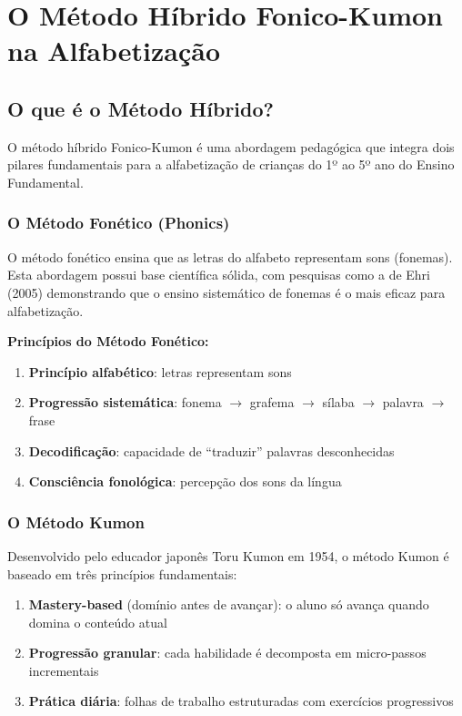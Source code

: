 
\chapter{O Método Híbrido Fonico-Kumon na Alfabetização}

\section{O que é o Método Híbrido?}

O método híbrido Fonico-Kumon é uma abordagem pedagógica que integra dois pilares fundamentais para a alfabetização de crianças do 1º ao 5º ano do Ensino Fundamental.

\subsection{O Método Fonético (Phonics)}

O método fonético ensina que as letras do alfabeto representam sons (fonemas). Esta abordagem possui base científica sólida, com pesquisas como a de Ehri (2005) demonstrando que o ensino sistemático de fonemas é o mais eficaz para alfabetização.

\textbf{Princípios do Método Fonético:}
\begin{enumerate}[leftmargin=2cm]
  \item \textbf{Princípio alfabético}: letras representam sons
  \item \textbf{Progressão sistemática}: fonema $\rightarrow$ grafema $\rightarrow$ sílaba $\rightarrow$ palavra $\rightarrow$ frase
  \item \textbf{Decodificação}: capacidade de ``traduzir'' palavras desconhecidas
  \item \textbf{Consciência fonológica}: percepção dos sons da língua
\end{enumerate}

\subsection{O Método Kumon}

Desenvolvido pelo educador japonês Toru Kumon em 1954, o método Kumon é baseado em três princípios fundamentais:

\begin{enumerate}[leftmargin=2cm]
  \item \textbf{Mastery-based} (domínio antes de avançar): o aluno só avança quando domina o conteúdo atual
  \item \textbf{Progressão granular}: cada habilidade é decomposta em micro-passos incrementais
  \item \textbf{Prática diária}: folhas de trabalho estruturadas com exercícios progressivos
\end{enumerate}

